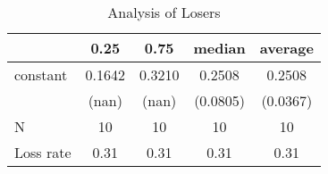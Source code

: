 \begin{table}
\caption{Analysis of Losers}
\begin{center}
\begin{tabular}{lcccc}
\hline
          &  0.25  &  0.75  &  median  & average   \\
\midrule
\midrule
constant  & 0.1642 & 0.3210 & 0.2508   & 0.2508    \\
          & (nan)  & (nan)  & (0.0805) & (0.0367)  \\
N         & 10     & 10     & 10       & 10        \\
Loss rate & 0.31   & 0.31   & 0.31     & 0.31      \\
\hline
\end{tabular}
\end{center}
\end{table}